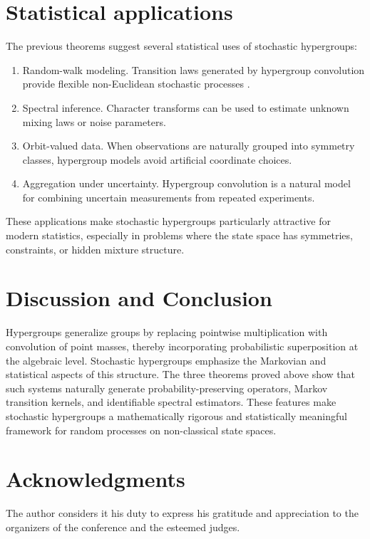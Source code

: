 \documentclass[twoside]{article}
\begin{document}
\section{Statistical applications}
 
The previous theorems suggest several statistical uses of stochastic hypergroups: 
\begin{enumerate}
 \item Random-walk modeling. Transition laws generated by hypergroup convolution provide flexible non-Euclidean stochastic processes \cite{Ross:2012}. 
 \item Spectral inference. Character transforms can be used to estimate unknown mixing laws or noise parameters. 
 \item Orbit-valued data. When observations are naturally grouped into symmetry classes, hypergroup models avoid artificial coordinate choices. 
 \item Aggregation under uncertainty. Hypergroup convolution is a natural model for combining uncertain measurements from repeated experiments. 
 \end{enumerate} 
 These applications make stochastic hypergroups particularly attractive for modern statistics, especially in problems where the state space has symmetries, constraints, or hidden mixture structure. 

\section*{Discussion and Conclusion}   

Hypergroups generalize groups by replacing pointwise multiplication with convolution of point masses, thereby incorporating probabilistic superposition at the algebraic level. Stochastic hypergroups emphasize the Markovian and statistical aspects of this structure. The three theorems proved above show that such systems naturally generate probability-preserving operators, Markov transition kernels, and identifiable spectral estimators. These features make stochastic hypergroups a mathematically rigorous and statistically meaningful framework for random processes on non-classical state spaces. 

\section*{Acknowledgments} 
The author considers it his duty to express his gratitude and appreciation to the organizers of the conference and the esteemed judges.
\end{document}
